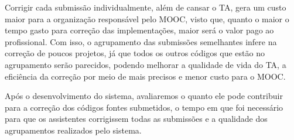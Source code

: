 Corrigir cada submissão individualmente, além de cansar o TA, gera um custo maior
para a organização responsável pelo MOOC, visto que, quanto o maior o tempo gasto
para correção das implementações, maior será o valor pago ao profissional. Com
isso, o agrupamento das submissões semelhantes infere na correção de poucos
projetos, já que todos os outros códigos que estão no agrupamento serão
parecidos, podendo melhorar a qualidade de vida do TA, a eficiência da correção
por meio de  mais precisos e menor custo para o MOOC.

Após o desenvolvimento do sistema, avaliaremos o quanto ele pode contribuir para
a correção dos códigos fontes submetidos, o tempo em que foi necessário para que
os assistentes corrigissem todas as submissões e a qualidade dos agrupamentos
realizados pelo sistema.